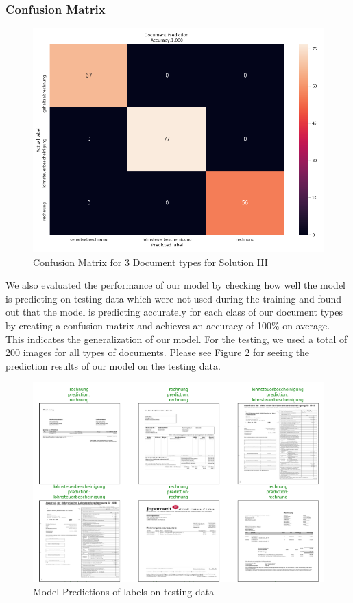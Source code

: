 \subsubsection{Confusion Matrix}
\begin{figure}[H]
\centering
\includegraphics[scale=0.8]{images/Chapter5/sol_3/cm3_sol3.png}
\caption{Confusion Matrix for 3 Document types for Solution III }
\label{cm_sol3}
\end{figure}
\par
We also evaluated the performance of our model by checking how well the model is predicting on testing data which were not used during the training and found out that the model is predicting accurately for each class of our document types by creating a confusion matrix and achieves an accuracy of 100\% on average. This indicates the generalization of our model. For the testing, we used a total of 200 images for all types of documents. Please see Figure \ref{pred_sol3} for seeing the prediction results of our model on the testing data.
\begin{figure}[H]
\centering
\includegraphics[scale=0.9]{images/Chapter5/sol_3/predictions_sol3.PNG}
\caption{Model Predictions of labels on testing data }
\label{pred_sol3}
\end{figure}
